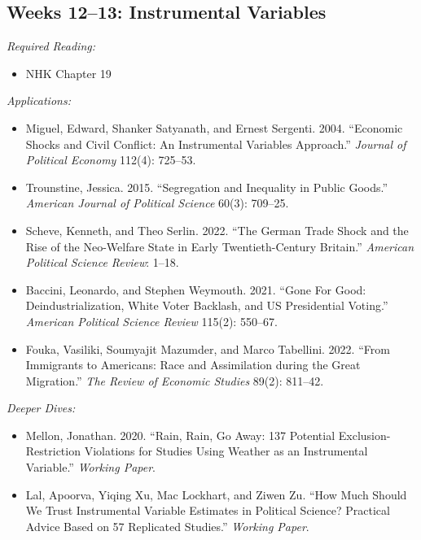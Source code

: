 \documentclass[11pt, letterpaper]{article}
\begin{document}
\subsection*{Weeks 12--13: Instrumental Variables}

\textit{Required Reading:}

\begin{itemize}
	\item NHK Chapter 19
\end{itemize}

\noindent\textit{Applications:}

\begin{itemize}
	\item Miguel, Edward, Shanker Satyanath, and Ernest Sergenti. 2004. ``Economic Shocks and Civil Conflict: An Instrumental Variables Approach.'' \textit{Journal of Political Economy} 112(4): 725–53.
	\item Trounstine, Jessica. 2015. ``Segregation and Inequality in Public Goods.'' \textit{American Journal of Political Science} 60(3): 709–25.
	\item Scheve, Kenneth, and Theo Serlin. 2022. ``The German Trade Shock and the Rise of the Neo-Welfare State in Early Twentieth-Century Britain.'' \textit{American Political Science Review}: 1–18.
	\item Baccini, Leonardo, and Stephen Weymouth. 2021. ``Gone For Good: Deindustrialization, White Voter Backlash, and US Presidential Voting.'' \textit{American Political Science Review} 115(2): 550–67.
	\item Fouka, Vasiliki, Soumyajit Mazumder, and Marco Tabellini. 2022. ``From Immigrants to Americans: Race and Assimilation during the Great Migration.'' \textit{The Review of Economic Studies} 89(2): 811–42.
\end{itemize}

\noindent \textit{Deeper Dives:}

\begin{itemize}
	\item Mellon, Jonathan. 2020. ``Rain, Rain, Go Away: 137 Potential Exclusion-Restriction Violations for Studies Using Weather as an Instrumental Variable.'' \textit{Working Paper}.
	\item Lal, Apoorva, Yiqing Xu, Mac Lockhart, and Ziwen Zu. ``How Much Should We Trust Instrumental Variable Estimates in Political Science? Practical Advice Based on 57 Replicated Studies.'' \textit{Working Paper}.
\end{itemize}
\end{document}
